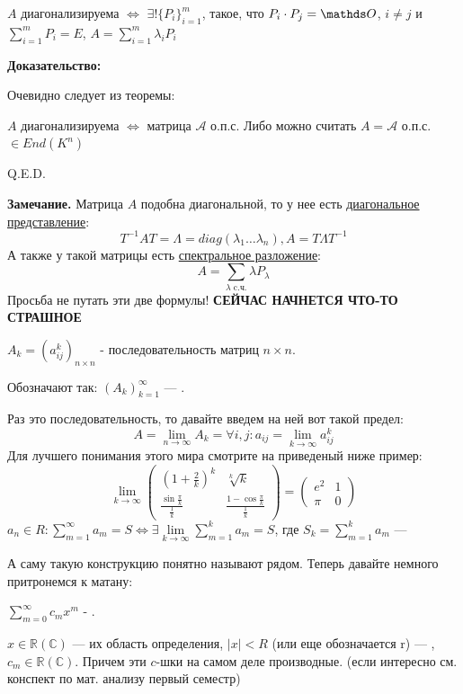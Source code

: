 $A$ диагонализируема $\Leftrightarrow$ $\exists! \{P_i\}_{i=1}^m$, такое, что  $P_i \cdot P_j = \zero$, $i\neq j$
и $\sum\limits_{i=1}^m P_i=E$,
$A = \sum\limits_{i=1}^m\lambda_iP_i$

\textbf{Доказательство:} 

Очевидно следует из теоремы: 

$A$ диагонализируема $\iff$ матрица $\mathcal{A}$ о.п.с. Либо можно считать  $A=\mathcal{A}$ о.п.с. 	$\in End (K^n)$

  \hfill Q.E.D.

\textbf{Замечание.} Матрица $A$ подобна диагональной, то у нее есть \uline{диагональное представление}:
$$T^{-1}AT = \Lambda = diag (\lambda_1 \dots \lambda_n), A = T \Lambda T^{-1}$$
А также у такой матрицы есть \uline{спектральное разложение}:
$$A=\sum\limits_{\lambda  \text{ c.ч.}}\lambda P_{\lambda}$$
Просьба не путать эти две формулы!
\textbf{СЕЙЧАС НАЧНЕТСЯ ЧТО-ТО СТРАШНОЕ}

 $A_k = (a_{ij}^k)_{n\times n}$ - последовательность матриц $n\times n$.

Обозначают так: $(A_k)_{k=1}^{\infty}$  --- .

Раз это последовательность, то давайте введем на ней вот такой предел:
$$A = \lim\limits_{n\rightarrow \infty} A_k = \forall i,j: a_{ij}=\lim\limits_{k\rightarrow \infty}a_{ij}^k$$
Для лучшего понимания этого мира смотрите на приведеный ниже пример:
$$\lim\limits_{k\rightarrow \infty}\left(
 \begin{matrix}
 (1+ \frac{2}{k})^k & \sqrt[k]{k} \\
 \frac{\sin \frac{\pi}k}{\frac1k} & \frac{1 - \cos \frac{\pi}k}{\frac{1}{k}}
 \end{matrix}
\right) = \left(
 \begin{matrix}
 e^2 & 1 \\
 \pi & 0
 \end{matrix}
\right)$$
 $a_n \in R: \sum\limits_{m=1}^{\infty}a_m = S \Leftrightarrow
\exists \lim\limits_{k \rightarrow \infty}\sum\limits_{m=1}^k a_m=S$, где $S_k =\sum\limits_{m=1}^k a_m $ --- 

А саму такую конструкцию понятно называют рядом. Теперь давайте немного притронемся к матану:

$\sum\limits_{m=0}^\infty c_mx^m$ - . 

$x\in \mathbb{R}(\mathbb{C})$ --- их область определения, $|x| < R$ (или еще обозначается r) --- , $c_m \in \mathbb{R}(\mathbb{C})$. Причем эти $c$-шки на самом деле производные. (если интересно см. конспект по мат. анализу первый семестр)

